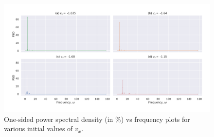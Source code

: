 \documentclass[a4paper]{article}
\begin{document}
		\begin{figure}
			\includegraphics[width=\columnwidth]{../task2/plots/q1-5_lin.jpg}
			\caption{One-sided power spectral density (in \%) vs frequency plots for various initial values of \(v_x\).}
			\label{fig:task2_lin}
		\end{figure}
		
\end{document}
